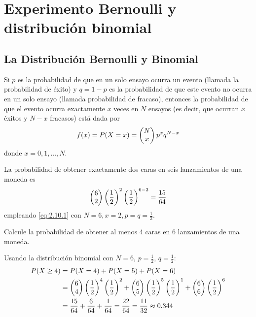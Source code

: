 \section{Experimento Bernoulli y distribución binomial}


\subsection{La Distribución Bernoulli y Binomial}


 Si $p$ es la probabilidad de que en un solo ensayo ocurra un evento (llamada la probabilidad de éxito) y $q = 1 - p$ es la
probabilidad de que este evento no ocurra en un solo ensayo (llamada probabilidad de fracaso), entonces la probabilidad de que el evento ocurra exactamente $x$ veces en $N$ ensayos (es decir, que ocurran $x$ éxitos y $N - x$ fracasos) está
dada por
\begin{align}
 \label{eq:2.10.1}
 f(x)=P(X=x)=\begin{pmatrix} N \\ x\end{pmatrix}p^{x}q^{N-x}
\end{align}
donde $x=0,1,...,N.$


 \begin{ejemplo}
  \label{exmp:2.10.1}
  La probabilidad de obtener exactamente dos caras en seis lanzamientos de una moneda es
  \begin{align}
   \begin{pmatrix} 6 \\ 2\end{pmatrix}\left( \dfrac{1}{2} \right)^{2}\left( \dfrac{1}{2} \right)^{6-2}=\dfrac{15}{64}
  \end{align}
empleando \eqref{eq:2.10.1} con $N=6, x=2, p=q=\frac{1}{2}.$
 \end{ejemplo}



\begin{ejemplo}
 \label{exmp:2.10.2}
 Calcule la probabilidad de obtener al menos 4 caras en 6 lanzamientos de una moneda.
\end{ejemplo}

\begin{solucion}
	Usando la distribución binomial con $N=6$, $p=\frac{1}{2}$, $q=\frac{1}{2}$:
	\begin{align}
		P(X \geq 4) &= P(X=4) + P(X=5) + P(X=6) \\
		&= \begin{pmatrix} 6 \\ 4\end{pmatrix}\left(\frac{1}{2}\right)^4\left(\frac{1}{2}\right)^2 + \begin{pmatrix} 6 \\ 5\end{pmatrix}\left(\frac{1}{2}\right)^5\left(\frac{1}{2}\right)^1 + \begin{pmatrix} 6 \\ 6\end{pmatrix}\left(\frac{1}{2}\right)^6 \\
		&= \frac{15}{64} + \frac{6}{64} + \frac{1}{64} = \frac{22}{64} = \frac{11}{32} \approx 0.344
	\end{align}
\end{solucion}



